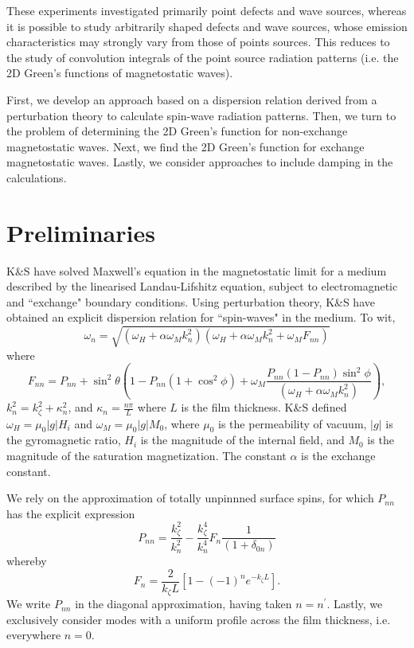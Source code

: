 \documentclass{article}
\begin{document}
These experiments investigated primarily point defects and wave sources, whereas it is possible to study arbitrarily shaped defects and wave sources, whose emission characteristics may strongly vary from those of points sources. 
This reduces to the study of convolution integrals of the point source radiation patterns (i.e. the 2D Green's functions of magnetostatic waves).

First, we develop an approach based on a dispersion relation derived from a perturbation theory to calculate spin-wave radiation patterns. 
Then, we turn to the problem of determining the 2D Green's function for non-exchange magnetostatic waves. 
Next, we find the 2D Green's function for exchange magnetostatic waves. 
Lastly, we consider approaches to include damping in the calculations.
%
%
%
%
\section{Preliminaries}
K\&{}S \cite{K_1980, KS_1986} have solved Maxwell's equation in the magnetostatic limit for a medium described by the linearised Landau-Lifshitz equation, subject to electromagnetic and ``exchange" boundary conditions. Using perturbation theory, K\&{}S have obtained an explicit dispersion relation for ``spin-waves" in the medium. To wit,
\begin{equation}\label{dispersion_main}
\omega_{n} = \sqrt{(\omega_{H} + \alpha \omega_{M} k_{n}^2)(\omega_{H} + \alpha \omega_{M} k_{n}^2 + \omega_{M} F_{nn})}
\end{equation}
where
\begin{equation}
F_{nn} = P_{nn} + \sin^2{\theta} \left(1 - P_{nn} \left( 1 + \cos^2{\phi}\right) + \omega_{M} \frac{P_{nn}(1-P_{nn})\sin^2{\phi}}{(\omega_{H} + \alpha \omega_{M} k_{n}^2)} \right),
\end{equation}
$k_{n}^2 = k_{\zeta}^2 + \kappa_{n}^2$, and $\kappa_{n} = \frac{n \pi}{L}$ where $L$ is the film thickness. K\&{}S defined $\omega_{H} = \mu_{0} |g| H_{i}$ and $\omega_{M} = \mu_{0} |g| M_{0}$, where $\mu_{0}$ is the permeability of vacuum, $|g|$ is the gyromagnetic ratio, $H_{i}$ is the magnitude of the internal field, and $M_{0}$ is the magnitude of the saturation magnetization. The constant $\alpha$ is the exchange constant.

We rely on the approximation of totally unpinnned surface spins, for which $P_{nn}$ has the explicit expression
\begin{equation}
P_{nn} = \frac{k_{\zeta}^2}{k_{n}^2} - \frac{k_{\zeta}^4}{k_{n}^4} F_{n} \frac{1}{(1 + \delta_{0n})}
\end{equation}
whereby
\begin{equation}
F_{n} = \frac{2}{k_{\zeta}L} [1 - (-1)^n e^{-k_{\zeta}L}].
\end{equation}
We write $P_{nn}$ in the diagonal approximation, having taken $n = n^{\prime}$. 
Lastly, we exclusively consider modes with a uniform profile across the film thickness, i.e. everywhere $n = 0$.
\end{document}
